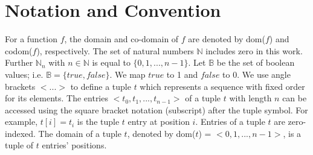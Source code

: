 \section{Notation and Convention}
\label{sec:notation}

For a function $f$, the domain and co-domain of $f$ are denoted by dom($f$) and codom($f$), respectively. The set of natural numbers $\mathbb{N}$ includes zero in this work. Further $\mathbb{N}_{n}$ with $n \in \mathbb{N}$ is equal to $\{0, 1, ..., n -1\}$. Let $\mathbb{B}$ be the set of boolean values; i.e. $\mathbb{B}=\{true, false\}$. We map $true$ to 1 and $false$ to 0. We use angle brackets $<...>$ to define a tuple $t$ which represents a sequence with fixed order for its elements. The entries $<t_0, t_1, ... , t_{n-1}>$ of a tuple $t$ with length $n$ can be accessed using the square bracket notation (subscript) after the tuple symbol. 
For example, $t[i]=t_i$ is the tuple $t$ entry at position $i$. 
Entries of a tuple $t$ are zero-indexed. 
The domain of a tuple $t$, denoted by dom($t$) = $<0,1,...,n-1>$, is a tuple of $t$ entries' positions.

